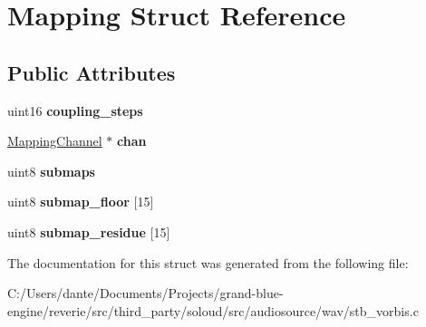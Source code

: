 \hypertarget{struct_mapping}{}\section{Mapping Struct Reference}
\label{struct_mapping}
\subsection*{Public Attributes}
\begin{DoxyCompactItemize}
\item 
\mbox{\label{struct_mapping_a3d85724ef6fa7567622ef3b7e32e461f}} 
uint16 {\bfseries coupling\+\_\+steps}
\item 
\mbox{\label{struct_mapping_a79ba491724417d271e3bdfbcef30ed3a}} 
\mbox{\hyperlink{struct_mapping_channel}{Mapping\+Channel}} $\ast$ {\bfseries chan}
\item 
\mbox{\label{struct_mapping_a85f22d25e206512903dcc39798939082}} 
uint8 {\bfseries submaps}
\item 
\mbox{\label{struct_mapping_ac5dc79c03a3b43ee554a081a5c37f70f}} 
uint8 {\bfseries submap\+\_\+floor} \mbox{[}15\mbox{]}
\item 
\mbox{\label{struct_mapping_a1b43a75bd402085e05799fc7bccc0600}} 
uint8 {\bfseries submap\+\_\+residue} \mbox{[}15\mbox{]}
\end{DoxyCompactItemize}


The documentation for this struct was generated from the following file\+:\begin{DoxyCompactItemize}
\item 
C\+:/\+Users/dante/\+Documents/\+Projects/grand-\/blue-\/engine/reverie/src/third\+\_\+party/soloud/src/audiosource/wav/stb\+\_\+vorbis.\+c\end{DoxyCompactItemize}
